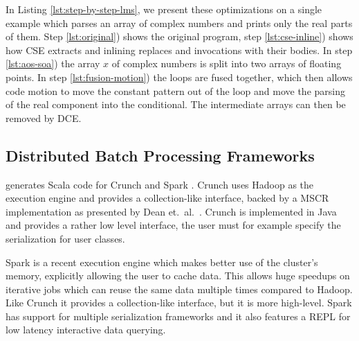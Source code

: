 In Listing \ref{lst:step-by-step-lms}, we present these optimizations on a
single example which parses an array of complex numbers and prints only the real parts of them.
Step \ref{lst:original}) shows the original program, step \ref{lst:cse-inline})
shows how CSE extracts  and inlining replaces  and 
invocations with their bodies. In step \ref{lst:aos-soa}) the array $x$ of
complex numbers is split into two arrays of floating points.
In step \ref{lst:fusion-motion}) the loops are fused together, which then allows
code motion to move the constant pattern out of the loop and move the parsing of the
real component into the conditional. The intermediate arrays can then be removed
by DCE.

\subsection{Distributed Batch Processing Frameworks}
\label{subsed:big-data-frameworks}

\tool generates Scala code for Crunch \cite{crunch} and Spark \cite{spark-nsdi}.
Crunch uses Hadoop as the execution engine and provides a collection-like
interface, backed by a MSCR implementation as presented by Dean et.\ al.\
\cite{chambers_flumejava:_2010}. Crunch is implemented in Java and provides a
rather low level interface, the user must for example specify the serialization
for user classes.

Spark is a recent execution engine which makes better use of the cluster's
memory, explicitly allowing the user to cache data. This allows huge speedups on
iterative jobs which can reuse the same data multiple times compared to Hadoop.
Like Crunch it provides a collection-like interface, but it is more high-level.
Spark has support for multiple serialization frameworks and it also features a
REPL for low latency interactive data querying.
